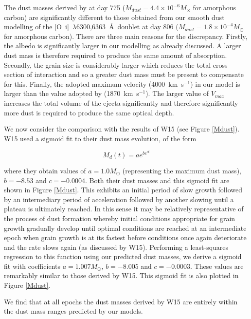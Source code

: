 \documentclass[useAMS,usenatbib,usegraphicx]{mnras}
\begin{document}
The dust masses derived by \citet{Lucy1989} at day 775 ($M_{dust}=4.4 \times 10^{-6} M_{\odot}$ for amorphous carbon) are significantly different to those obtained from our smooth dust modelling of the [O~{\sc i}]~$\lambda$6300,6363~\AA\ doublet at day 806 ($M_{dust}=1.8 \times 10^{-4} M_{\odot}$ for amorphous carbon).  There are three main reasons for the discrepancy.  Firstly, the albedo is significantly larger in our modelling as already discussed.  A larger dust mass is therefore required to produce the same amount of absorption.  Secondly, the grain size is considerably larger which reduces the total cross-section of interaction and so a greater dust mass must be present to compensate for this. Finally, the adopted maximum velocity (4000~km~s$^{-1}$) in our model is larger than the value adopted by \citet{Lucy1989} (1870~km~s$^{-1}$).  The larger value of $V_{max}$ increases the total volume of the ejecta significantly and therefore significantly more dust is required to produce the same optical depth.


We now consider the comparison with the results of W15 (see Figure \ref{Mdust}).  W15 used a sigmoid 
fit to their dust mass evolution, of the form

\begin{equation}
M_d(t)=ae^{be^{ct}}
\end{equation}
 
\noindent where they obtain values of $a=1.0M_{\odot}$ (representing the maximum 
dust mass), $b=-8.53$ and $c=-0.0004$.  Both their dust masses and this 
sigmoid fit are shown in Figure \ref{Mdust}.  This exhibits an initial 
period of slow growth followed by an intermediary period of acceleration 
followed by another slowing until a plateau is ultimately reached.  In 
this sense it may be relatively representative of the process of dust 
formation whereby initial conditions appropriate for grain growth 
gradually develop until optimal conditions are reached at an intermediate 
epoch when grain growth is at its fastest before conditions once again 
deteriorate and the rate slows again (as discussed by W15).  Performing a 
least-squares regression to this function using our predicted dust masses, 
we derive a sigmoid fit with coefficients $a=1.007M_{\odot}$, $b=-8.005$ 
and $c=-0.0003$.  These values are remarkably similar to those derived 
by W15.  This sigmoid fit is also plotted in Figure \ref{Mdust}.

We find that at all epochs  the dust masses derived by W15 are entirely within the dust mass ranges predicted by our models.
\end{document}
